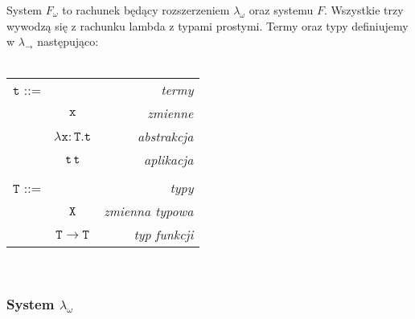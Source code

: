 \documentclass[11pt,leqno]{article}
\begin{document}
System $F_{\omega}$ to rachunek będący rozszerzeniem $\lambda_{\omega}$ oraz systemu $F$.
Wszystkie trzy wywodzą się z rachunku lambda z typami prostymi. Termy oraz typy definiujemy w $\lambda_{\rightarrow}$ następująco: \\ \\
\begin{tabular}{| l c r |}
  \hline
  $\mathtt{t}$ ::= &  & \textit{termy}  \\
   & $\mathtt{x}$ & \textit{zmienne}  \\
   & $\mathtt{\lambda x:T.t}$ & \textit{abstrakcja} \\
   & $\mathtt{t \hspace{0.2em} t}$ & \textit{aplikacja} \\
   & & \\
  $\mathtt{T}$ ::= &  & \textit{typy} \\
   & $\mathtt{X}$ & \textit{zmienna typowa} \\
   & $\mathtt{T \rightarrow T}$ & \textit{typ funkcji} \\
  \hline
\end{tabular} \\



\subsubsection{System $\lambda_{\omega}$} 
\end{document}
